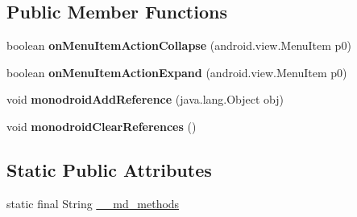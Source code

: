 \subsection*{Public Member Functions}
\begin{DoxyCompactItemize}
\item 
\mbox{\label{classmono_1_1android_1_1support_1_1v4_1_1view_1_1_menu_item_compat___on_action_expand_listener_implementor_a9ea5677e5f21bf5c3aa69d8242db44aa}} 
boolean {\bfseries on\+Menu\+Item\+Action\+Collapse} (android.\+view.\+Menu\+Item p0)
\item 
\mbox{\label{classmono_1_1android_1_1support_1_1v4_1_1view_1_1_menu_item_compat___on_action_expand_listener_implementor_adc73b3f61a71f2de8c3fe9e578c58463}} 
boolean {\bfseries on\+Menu\+Item\+Action\+Expand} (android.\+view.\+Menu\+Item p0)
\item 
\mbox{\label{classmono_1_1android_1_1support_1_1v4_1_1view_1_1_menu_item_compat___on_action_expand_listener_implementor_ae1594db9eea57bbf63d3077de01f3c24}} 
void {\bfseries monodroid\+Add\+Reference} (java.\+lang.\+Object obj)
\item 
\mbox{\label{classmono_1_1android_1_1support_1_1v4_1_1view_1_1_menu_item_compat___on_action_expand_listener_implementor_a725ef56bb9745c14ea40b598752c24c3}} 
void {\bfseries monodroid\+Clear\+References} ()
\end{DoxyCompactItemize}
\subsection*{Static Public Attributes}
\begin{DoxyCompactItemize}
\item 
static final String \hyperlink{classmono_1_1android_1_1support_1_1v4_1_1view_1_1_menu_item_compat___on_action_expand_listener_implementor_a784a531fa2fd045297a4b6c40ff359a1}{\+\_\+\+\_\+md\+\_\+methods}
\end{DoxyCompactItemize}


